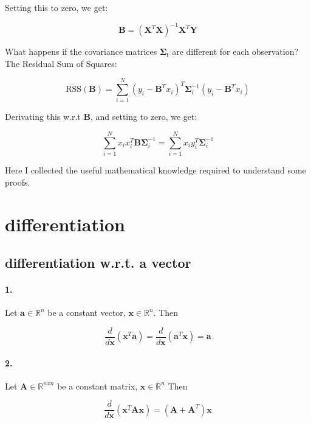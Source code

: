 \documentclass{article}
\begin{document}
Setting this to zero, we get:

\[
\mathbf{B} = (\mathbf{X}^T\mathbf{X})^{-1}\mathbf{X}^T\mathbf{Y}
\]

What happens if the covariance matrices $\mathbf{\Sigma_i}$ are different for each observation? The Residual Sum of Squares:

\[
\text{RSS}(\mathbf{B}) = \sum_{i=1}^{N} (y_i - \mathbf{B}^Tx_i)^T \mathbf{\Sigma}^{-1}_i (y_i - \mathbf{B}^Tx_i)
\]

Derivating this w.r.t $\mathbf{B}$, and setting to zero, we get:

\[
\sum_{i=1}^{N} x_i x^T_i \mathbf{B} \mathbf{\Sigma}^{-1}_i = \sum_{i=1}^{N} x_i y^T_i \mathbf{\Sigma}^{-1}_i
\]

\newpage
\begin{appendices}

Here I collected the useful mathematical knowledge required to understand some proofs.

\section{differentiation}

\subsection{differentiation w.r.t. a vector}

\paragraph{1.} Let $\mathbf{a} \in \mathbb{R}^n$ be a constant vector, $\mathbf{x} \in \mathbb{R}^n$. Then

\begin{equation} \label{eq:da_dx}
    \frac{d}{d\mathbf{x}} (\mathbf{x}^{T}\mathbf{a}) = \frac{d}{d\mathbf{x}} (\mathbf{a}^{T}\mathbf{x}) = \mathbf{a}
\end{equation}

\paragraph{2.} Let $\mathbf{A} \in \mathbb{R}^{nxn}$ be a constant matrix, $\mathbf{x} \in \mathbb{R}^n$ Then

\begin{equation} \label{eq:dA_dx}
    \frac{d}{d\mathbf{x}} (\mathbf{x}^{T}\mathbf{A}\mathbf{x}) = (\mathbf{A} + \mathbf{A}^T) \mathbf{x}
\end{equation}


\end{appendices}
\end{document}
